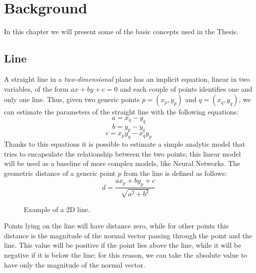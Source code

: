 \chapter{Background}
\label{ch:background}
In this chapter we will present some of the basic concepts used in the Thesis. 

\section{Line}
\label{sec:line}
A straight line in a \textit{two-dimensional} plane has an implicit equation, linear in two variables, of the form $ax + by + c = 0$ and each couple of points identifies one and only one line. Thus, given two generic points $p = (x_p, y_p)$ and $q = (x_q, y_q)$, we can estimate the parameters of the straight line with the following equations:
\begin{equation}
    a = x_q - y_q
\end{equation}
\begin{equation}
    b = y_p - y_q
\end{equation}
\begin{equation}
    c = x_py_q - x_qy_p
\end{equation}
Thanks to this equations it is possible to estimate a simple analytic model that tries to encapsulate the relationship between the two points; this linear model will be used as a baseline of more complex models, like Neural Networks. The geometric distance of a generic point $p$ from the line is defined as follows:
\begin{equation}
    d = \frac{ax_p + by_p + c}{\sqrt{a^2 + b^2}}
\end{equation}

\begin{figure}[htb]
    \centering
    
    \caption{Example of a 2D line.}
    \label{fig:generic_line}
\end{figure}

Points lying on the line will have distance zero, while for other points this distance is the magnitude of the normal vector passing through the point and the line. This value will be positive if the point lies above the line, while it will be negative if it is below the line; for this reason, we can take the absolute value to have only the magnitude of the normal vector.

